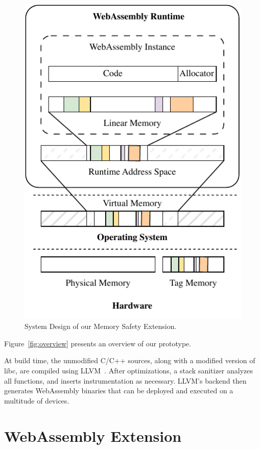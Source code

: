 \begin{figure}[t]
    \centering
    \includegraphics[scale=1]{figures/build/system-design-2}
    \caption{System Design of our Memory Safety Extension.}
    \label{fig:system-design-2}
\end{figure}

Figure~\ref{fig:overview} presents an overview of our prototype.

At build time, the unmodified C/C++ sources, along with a modified version of libc, are compiled using LLVM~\cite{lattner2004llvm}.
After optimizations, a stack sanitizer analyzes all functions, and inserts instrumentation as necessary.
LLVM's backend then generates WebAssembly binaries that can be deployed and executed on a multitude of devices.

\section{WebAssembly Extension}
\label{sec:wasm-extension}

